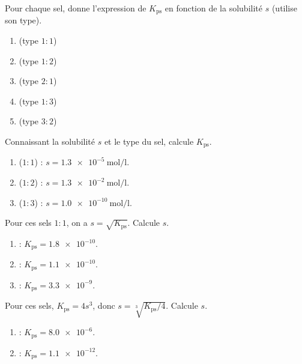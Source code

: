 \documentclass[11pt,a4paper]{article}
\begin{document}
\begin{exo}
Pour chaque sel, donne l'expression de $K_{\mathrm{ps}}$ en fonction de la solubilité $s$ (utilise son
type).
\begin{enumerate}[label=\alph*)]
  \item {} (type $1{:}1$)
  \item {} (type $1{:}2$)
  \item {} (type $2{:}1$)
  \item {} (type $1{:}3$)
  \item {} (type $3{:}2$)
\end{enumerate}
\end{exo}

\begin{exo}
Connaissant la solubilité $s$ et le type du sel, calcule $K_{\mathrm{ps}}$.
\begin{enumerate}[label=\alph*)]
  \item {} ($1{:}1$) : $s=\qty{1.3e-5}{\mole\per\litre}$.
  \item {} ($1{:}2$) : $s=\qty{1.3e-2}{\mole\per\litre}$.
  \item {} ($1{:}3$) : $s=\qty{1.0e-10}{\mole\per\litre}$.
\end{enumerate}
\end{exo}

\begin{exo}
Pour ces sels $1{:}1$, on a $s=\sqrt{K_{\mathrm{ps}}}$. Calcule $s$.
\begin{enumerate}[label=\alph*)]
  \item {} : $K_{\mathrm{ps}}=\num{1.8e-10}$.
  \item {} : $K_{\mathrm{ps}}=\num{1.1e-10}$.
  \item {} : $K_{\mathrm{ps}}=\num{3.3e-9}$.
\end{enumerate}
\end{exo}

\begin{exo}
Pour ces sels, $K_{\mathrm{ps}}=4s^{3}$, donc $s=\sqrt[3]{K_{\mathrm{ps}}/4}$. Calcule $s$.
\begin{enumerate}[label=\alph*)]
  \item {} : $K_{\mathrm{ps}}=\num{8.0e-6}$.
  \item {} : $K_{\mathrm{ps}}=\num{1.1e-12}$.
\end{enumerate}
\end{exo}
\end{document}
